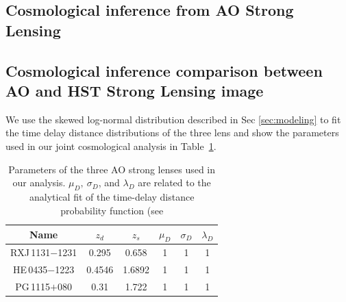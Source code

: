 \documentclass[useAMS,usenatbib]{mnras}
\newcommand\rxj{RXJ\,1131$-$1231}
\newcommand\he{HE\,0435$-$1223}
\newcommand\pg{PG\,1115$+$080}
\newcommand{\tref}[1]{Table~\ref{#1}}
\def\planck{\textit{planck}}
\begin{document}


\subsection{Cosmological inference from AO Strong Lensing}
\label{subsec:cosmoAO}
\subsection{Cosmological inference comparison between AO and HST Strong Lensing image}
We use the skewed log-normal distribution described in Sec \ref{sec:modeling} to fit the time delay distance distributions of the three lens and show the parameters used in our joint cosmological analysis in \tref{table:TDfitting}. 

\begin{table}
\centering
\caption{Parameters of the three AO strong lenses used in our analysis. $\mu_{D},~\sigma_{D}$, and $\lambda_{D}$ are related to the analytical fit of the time-delay distance probability function (see}
\label{table:TDfitting}
 \begin{tabular}{||c c c c c c||} 
 \hline
 Name & $z_{d}$ & $z_{s}$ & $\mu_{D}$ & $\sigma_{D}$ & $\lambda_{D}$\\ [0.2ex] 
 \hline\hline
 \rxj & 0.295 & 0.658 & 1&1&1 \\ 
 \hline
 \he & 0.4546 & 1.6892 & 1&1&1\\
 \hline
 \pg & 0.31 & 1.722 &  1&1&1\\
 \hline
 
 \end{tabular}

\end{table}
\end{document}
